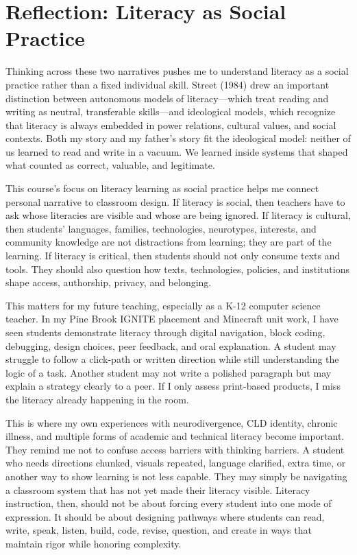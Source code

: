 \documentclass[11pt]{article}
\begin{document}
\section*{Reflection: Literacy as Social Practice}

Thinking across these two narratives pushes me to understand literacy as a social practice rather than a fixed individual skill. Street (1984) drew an important distinction between autonomous models of literacy---which treat reading and writing as neutral, transferable skills---and ideological models, which recognize that literacy is always embedded in power relations, cultural values, and social contexts. Both my story and my father's story fit the ideological model: neither of us learned to read and write in a vacuum. We learned inside systems that shaped what counted as correct, valuable, and legitimate.

This course's focus on literacy learning as social practice helps me connect personal narrative to classroom design. If literacy is social, then teachers have to ask whose literacies are visible and whose are being ignored. If literacy is cultural, then students' languages, families, technologies, neurotypes, interests, and community knowledge are not distractions from learning; they are part of the learning. If literacy is critical, then students should not only consume texts and tools. They should also question how texts, technologies, policies, and institutions shape access, authorship, privacy, and belonging.

This matters for my future teaching, especially as a K-12 computer science teacher. In my Pine Brook IGNITE placement and Minecraft unit work, I have seen students demonstrate literacy through digital navigation, block coding, debugging, design choices, peer feedback, and oral explanation. A student may struggle to follow a click-path or written direction while still understanding the logic of a task. Another student may not write a polished paragraph but may explain a strategy clearly to a peer. If I only assess print-based products, I miss the literacy already happening in the room.

This is where my own experiences with neurodivergence, CLD identity, chronic illness, and multiple forms of academic and technical literacy become important. They remind me not to confuse access barriers with thinking barriers. A student who needs directions chunked, visuals repeated, language clarified, extra time, or another way to show learning is not less capable. They may simply be navigating a classroom system that has not yet made their literacy visible. Literacy instruction, then, should not be about forcing every student into one mode of expression. It should be about designing pathways where students can read, write, speak, listen, build, code, revise, question, and create in ways that maintain rigor while honoring complexity.
\end{document}
